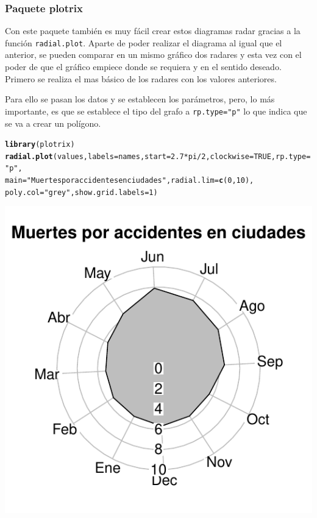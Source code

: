 \documentclass{article}\usepackage[]{graphicx}\usepackage[]{color}
\makeatletter
\def\maxwidth{ %
  \ifdim\Gin@nat@width>\linewidth
    \linewidth
  \else
    \Gin@nat@width
  \fi
}
\newcommand{\hlnum}[1]{\textcolor[rgb]{0.686,0.059,0.569}{#1}}%
\newcommand{\hlstr}[1]{\textcolor[rgb]{0.192,0.494,0.8}{#1}}%
\newcommand{\hlopt}[1]{\textcolor[rgb]{0,0,0}{#1}}%
\newcommand{\hlstd}[1]{\textcolor[rgb]{0.345,0.345,0.345}{#1}}%
\newcommand{\hlkwc}[1]{\textcolor[rgb]{0.333,0.667,0.333}{#1}}%
\newcommand{\hlkwd}[1]{\textcolor[rgb]{0.737,0.353,0.396}{\textbf{#1}}}%
\newenvironment{kframe}{%
 \def\at@end@of@kframe{}%
 \ifinner\ifhmode%
  \def\at@end@of@kframe{\end{minipage}}%
  \begin{minipage}{\columnwidth}%
 \fi\fi%
 \def\FrameCommand##1{\hskip\@totalleftmargin \hskip-\fboxsep
 \colorbox{shadecolor}{##1}\hskip-\fboxsep
     \hskip-\linewidth \hskip-\@totalleftmargin \hskip\columnwidth}%
 \MakeFramed {\advance\hsize-\width
   \@totalleftmargin\z@ \linewidth\hsize
   \@setminipage}}%
 {\par\unskip\endMakeFramed%
 \at@end@of@kframe}
\newenvironment{knitrout}{}{} %
\makeatother
\begin{document}
\subsubsection{Paquete plotrix}
Con este paquete %
tambi\'en es muy f\'acil crear estos diagramas radar gracias a la funci\'on \texttt{radial.plot}. Aparte de poder realizar el diagrama al igual que el anterior, se pueden comparar en un mismo gr\'afico dos radares y esta vez con el poder de que el gr\'afico empiece donde se requiera y en el sentido deseado.~\\
Primero se realiza el mas b\'asico de los radares con los valores anteriores.


Para ello se pasan los datos y se establecen los par\'ametros, pero, lo m\'as importante, es que se establece el tipo del grafo a \texttt{rp.type="p"} lo que indica que se va a crear un pol\'igono.
\begin{knitrout}
\color{fgcolor}\begin{kframe}
\begin{alltt}
\hlkwd{library}\hlstd{(plotrix)}
\hlkwd{radial.plot}\hlstd{(values,}\hlkwc{labels}\hlstd{=names,} \hlkwc{start} \hlstd{=} \hlnum{2.7}\hlopt{*}\hlstd{pi}\hlopt{/}\hlnum{2}\hlstd{,} \hlkwc{clockwise} \hlstd{=} \hlnum{TRUE}\hlstd{,}\hlkwc{rp.type}\hlstd{=}\hlstr{"p"}\hlstd{,}
            \hlkwc{main}\hlstd{=}\hlstr{"Muertes por accidentes en ciudades"}\hlstd{,}\hlkwc{radial.lim}\hlstd{=}\hlkwd{c}\hlstd{(}\hlnum{0}\hlstd{,}\hlnum{10}\hlstd{),}
            \hlkwc{poly.col}\hlstd{=}\hlstr{"grey"}\hlstd{,}\hlkwc{show.grid.labels}\hlstd{=}\hlnum{1}\hlstd{)}
\end{alltt}
\end{kframe}

{\centering \includegraphics[width=\maxwidth]{figure/plot_plotrix_1-1} 

}



\end{knitrout}
\end{document}
